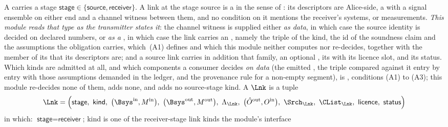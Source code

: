 \begin{definition}\label{def:link}
A
carries a stage $\textsf{stage}\in\{\textsf{source},\textsf{receiver}\}$.
A link at the stage \textsf{source} is a  in the sense of
: its descriptors are Alice-side, a
 with a signal ensemble on either end and a channel
witness between them, and no condition on it mentions the receiver's
systems,  or measurements.
\emph{This module reads that type as the transmitter states it}: the channel
witness is supplied either
\emph{as data}, in which case the source identity is decided on declared
numbers, or \emph{as a }, in which case the link
carries an , namely the triple of the kind, the id of
the soundness claim and the assumptions the obligation carries, which
\,(A1) defines and which this module
neither computes nor re-decides, together with the member of its
 that its descriptors are; and a source link
carries in addition that family, an optional
, its
 with its licence slot, and its status.
Which kinds are admitted at all, and which components a consumer decides
\emph{on data} (the emitted , the triple compared
against it entry by entry with those assumptions demanded in the ledger, and
the provenance rule for a non-empty segment), is
, conditions (A1) to (A3); this module
re-decides none of them, adds none, and adds no source-stage kind. A
$\Lnk$ is a tuple
\begin{equation}\label{eq:link}
  \Lnk=\Big(\textsf{stage},\ \textsf{kind},\
  \big(\Bsys^{\mathrm{in}},M^{\mathrm{in}}\big),\
  \big(\Bsys^{\mathrm{out}},M^{\mathrm{out}}\big),\
  \Lambda_{\Lnk},\
  \big(\hat O^{\mathrm{out}},O^{\mathrm{in}}\big),\
  \Srch_{\Lnk},\
  \CList_{\Lnk},\
  \textsf{licence},\ \textsf{status}\Big)
\end{equation}
in which: $\textsf{stage}=\textsf{receiver}$;
\textsf{kind} is one of the receiver-stage link kinds the module's interface

\end{definition}
